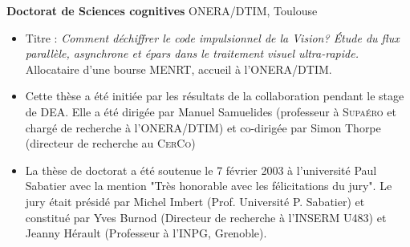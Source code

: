 \documentclass[10pt,french,a4paper,twoside]{article}%
\newcommand{\years}[1]{\marginpar{\textit{\scriptsize #1}}}
\begin{document}
\vspace*{.3cm}
	\textbf{Doctorat de Sciences cognitives} ONERA/DTIM, Toulouse \hfill \years{\textbf{1999-2003}} \\
\vspace*{-.15in}
\begin{itemize}
\item[] Titre : \emph{Comment déchiffrer le code impulsionnel de la Vision? \'Etude du flux parallèle, asynchrone et épars  dans le traitement visuel ultra-rapide.}  Allocataire d'une bourse MENRT, accueil à  l'ONERA/DTIM.
		\item %
		Cette thèse a été initiée par les résultats de la collaboration pendant le stage de DEA. Elle a été dirigée par Manuel Samuelides (professeur à  \textsc{Supaéro} et chargé de recherche à  l'ONERA/DTIM) et co-dirigée par Simon Thorpe (directeur de recherche au \textsc{CerCo})
		\item %
		La thèse de doctorat a été soutenue le 7 février 2003 à  l'université Paul Sabatier avec la mention "Très honorable avec les félicitations du jury". Le jury était présidé par Michel Imbert (Prof. Université P. Sabatier) et constitué par Yves Burnod (Directeur de recherche à  l'\textsc{INSERM} U483) et Jeanny Hérault (Professeur à  l'INPG, Grenoble).
\end{itemize} %
\end{document}
